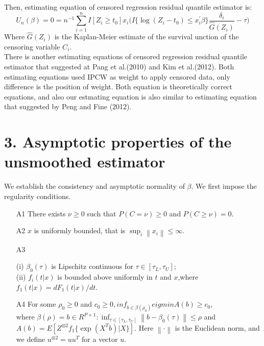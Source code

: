 \documentclass[12pt]{article}
\begin{document}
	Then, estimating equation of censored regression residual quantile estimator is:
	\begin{equation} \label{eq:5}
	U_n(\beta) = 0 = n^{-1}\sum_{i=1}^{n}I[Z_i \ge t_0] x_i \Big(I\{\log(Z_i - t_0) \leq x_i^{\prime}\beta\} \frac{\delta_i}{\hat{G}(Z_i)}  -\tau \Big)
	\end{equation}
	Where $\hat{G}(Z_i)$ is the Kaplan-Meier estimate of the survival unction of the censoring variable $C_i$.\\
	There is another estimating equations of censored regression residual quantile estimator that suggested at Pang et al.(2010) and Kim et al.(2012). Both estimating equations used IPCW as weight to apply censored data, only difference is the position of weight. Both equation is theoretically correct equations, and also our estmating equation is also similar to estimating equation that suggested by Peng and Fine (2012).
	
\section{3. Asymptotic properties of the unsmoothed estimator}
	We establish the consistency and asymptotic normality of $\beta$. We first impose the regularity conditions.
	
	\begin{enumerate}
		\item[A1] There exists $\nu \ge 0$ such that $P(C = \nu) \ge 0$ and $P(C \ge \nu) =0$.
		\item[A2] $x$ is uniformly bounded, that is $\sup_i \left\lVert x_i \right\rVert \le \infty$. 
		\item[A3] 
		\begin{flushleft}
			(i) $\beta_0(\tau)$ is Lipschitz continuous for $\tau \in [\tau_L, \tau_U]$;\\
			(ii) $f_i(t|x)$ is bounded above uniformly in $t$ and $x$,where $f_1(t|x) = dF_1(t|x)/dt$.
		\end{flushleft}
		\item[A4] For some $\rho_0 \ge 0$ and $c_0 \ge 0, inf_{b \in \beta(\rho_0)} eigmin A(b) \geq c_0$,\\ where $\beta(\rho)={b\in R^{P+1} : \inf_{\tau \in [\tau_L, \tau_U]}
		\left\lVert b-\beta_0(\tau) \right\rVert \leq \rho}$ and $A(b) = E[Z^{\otimes2}f_1 \{\exp(X^T b)|X\}]$. Here $\left\lVert \cdot \right\rVert$ is the Euclidean norm, and we define $u^{\otimes2} = uu^T$ for a vector $u$.
	\end{enumerate}
\end{document}
